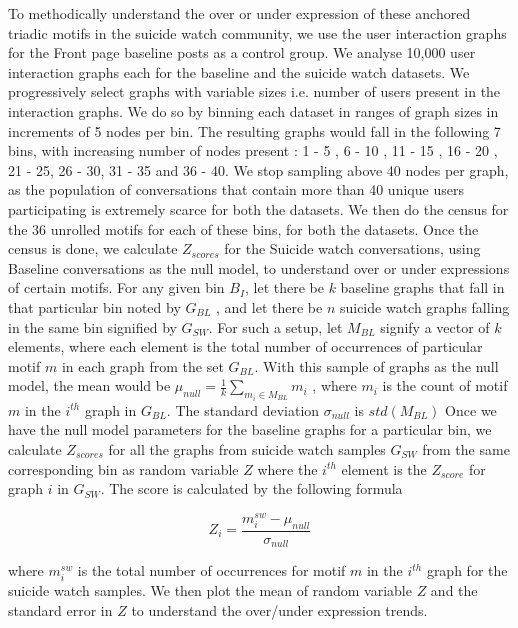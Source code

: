 To methodically understand the over or under expression of these anchored triadic motifs in the suicide watch community, we use the user interaction graphs for the Front page baseline posts as a control group. We analyse 10,000 user interaction graphs each for the baseline and the suicide watch datasets.
We progressively select graphs with variable sizes i.e. number of users present in the interaction graphs. We do so by binning each dataset in ranges of graph sizes in increments of 5 nodes per bin. The resulting graphs would fall in the following 7 bins, with increasing number of nodes present : 1 - 5 , 6 - 10 , 11 - 15 , 16 - 20 , 21 - 25, 26 - 30, 31 - 35 and 36 - 40. We stop sampling above 40 nodes per graph, as the population of conversations that contain more than 40 unique users participating is extremely scarce for both the datasets.
We then do the census for the 36 unrolled motifs for each of these bins, for both the datasets. 
Once the census is done, we calculate $Z_{scores}$ for the Suicide watch conversations, using Baseline conversations as the null model, to understand over or under expressions of certain motifs. 
For any given bin $B_I$, let there be $k$ baseline graphs that fall in that particular bin noted by $G_{BL}$ , and let there be $n$ suicide watch graphs falling in the same bin signified by $G_{SW}$. For such a setup, let $M_{BL}$ signify a vector of $k$ elements, where each element is the total number of occurrences of particular motif $m$ in each graph from the set $G_{BL}$. With this sample of graphs as the null model, the mean would be $\mu_{null} = \frac{1}{k}\sum_{m_i \in M_{BL}}^{}m_i$ , where $m_i$ is the count of motif $m$ in the $i^{th}$ graph in  $G_{BL}$. The standard deviation $\sigma_{null}$ is $std(M_{BL})$
Once we have the null model parameters for the baseline graphs for a particular bin, we calculate $Z_{scores}$ for all the graphs from suicide watch samples $G_{SW}$ from the same corresponding bin as random variable $Z$ where the $i^{th}$ element is the $Z_{score}$ for graph $i$ in $G_{SW}$. The score is calculated by the following formula 

$$ Z_i = \frac{m_i^{sw} - \mu_{null}}{\sigma_{null}} $$ 

where $m_i^{sw}$ is the total number of occurrences for motif $m$ in the $i^{th}$ graph for the suicide watch samples. We then plot the mean of random variable $Z$ and the standard error in $Z$ to understand the over/under expression trends.


